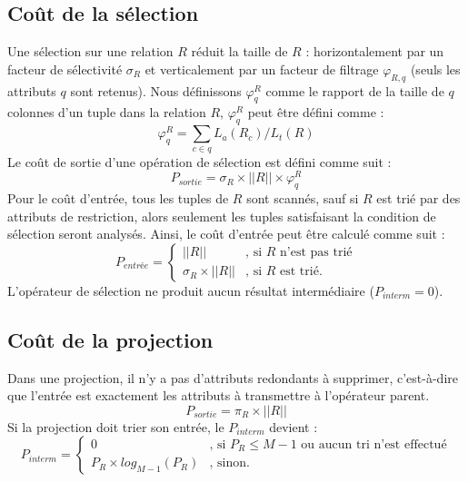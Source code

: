 \subsection{Coût de la sélection}
Une sélection sur une relation $R$ réduit la taille de $R$ : horizontalement par un facteur de sélectivité $\sigma_R$ et verticalement par un facteur de filtrage $\varphi_{R, q}$ (seuls les attributs $q$ sont retenus). Nous définissons $\varphi_{q}^{R}$ comme le rapport de la taille de $q$ colonnes d'un tuple dans la relation $R$, $\varphi_{q}^{R}$ peut être défini comme :
\begin{equation}
\varphi_{q}^{R} = \sum_{c \in q}{L_a(R_c)/L_t(R)}
\end{equation}
Le coût de sortie d'une opération de sélection est défini comme suit :
\begin{equation}
P_{sortie} = \sigma_R \times || R || \times \varphi_{q}^{R}
\end{equation}
Pour le coût d'entrée, tous les tuples de $R$ sont scannés, sauf si $R$ est trié par des attributs de restriction, alors seulement les tuples satisfaisant la condition de sélection seront analysés. Ainsi, le coût d'entrée peut être calculé comme suit :
\begin{equation}
 P_{entrée} = \begin{cases}
			|| R || & \text{, si $R$ n'est pas trié} \\
			\sigma_R \times || R || & \text{, si $R$ est trié}.
\end{cases}
\end{equation}
L'opérateur de sélection ne produit aucun résultat intermédiaire ($P_{interm} = 0$).

\subsection{Coût de la projection}
Dans une projection, il n'y a pas d'attributs redondants à supprimer, c'est-à-dire que l'entrée est exactement les attributs à transmettre à l'opérateur parent.
\begin{equation}
P_{sortie} = \pi_R \times || R ||
\end{equation}
Si la projection doit trier son entrée, le $P_{interm}$ devient :
\begin{equation}
 P_{interm} = \begin{cases}
			0 & \text{, si } P_R \leqslant M - 1 \text{ ou aucun tri n'est effectué} \\
			P_R \times log_{M-1}(P_R) & \text{, sinon.}
\end{cases}
\end{equation}


